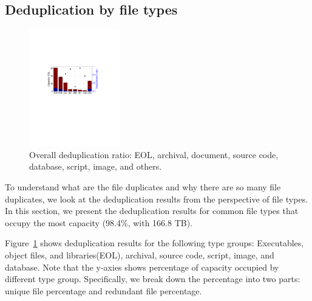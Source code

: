 
\subsection{Deduplication by file types}

\begin{figure} \centering
\includegraphics[width=0.35\textwidth]{graphs/dedup-overall} \caption{Overall
deduplication ratio: EOL, archival, document, source code, database, script,
image, and others.} \label{fig:dedup-overall} \end{figure}

%		

To understand what are the file duplicates and why there are so many file
duplicates, we look at the deduplication results from the perspective of file
types. In this section, we present the deduplication results for common file
types that occupy the most capacity (98.4\%, with 166.8 TB).

Figure~\ref{fig:dedup-overall} shows deduplication results for the following
type groups: Executables, object files, and libraries(EOL), archival, source
code, script, image, and database. Note that the y-axies shows percentage of
capacity occupied by different type group. Specifically, we break down the
percentage into two parts: unique file percentage and redundant file
percentage.


